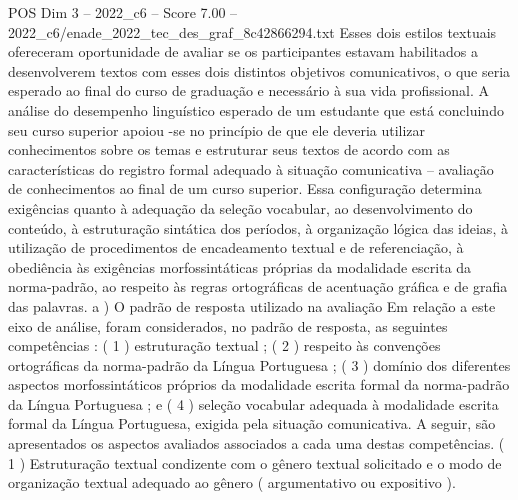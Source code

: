 \begin{textsample}{POS Dim 3 – 2022\_c6 – Score 7.00 – 2022\_c6/enade\_2022\_tec\_des\_graf\_8c42866294.txt}
Esses dois estilos textuais ofereceram oportunidade de avaliar se os participantes estavam habilitados a desenvolverem textos com esses dois distintos objetivos comunicativos, o que seria esperado ao final do curso de graduação e necessário à sua vida profissional.
A análise do desempenho linguístico esperado de um estudante que está concluindo seu curso superior apoiou -se no princípio de que ele deveria utilizar conhecimentos sobre os temas e estruturar seus textos de acordo com as características do registro formal adequado à situação comunicativa – avaliação de conhecimentos ao final de um curso superior.
Essa configuração determina exigências quanto à adequação da seleção vocabular, ao desenvolvimento do conteúdo, à estruturação sintática dos períodos, à organização lógica das ideias, à utilização de procedimentos de encadeamento textual e de referenciação, à obediência às exigências morfossintáticas próprias da modalidade escrita da norma-padrão, ao respeito às regras ortográficas de acentuação gráfica e de grafia das palavras. a ) O padrão de resposta utilizado na avaliação Em relação a este eixo de análise, foram considerados, no padrão de resposta, as seguintes competências : ( 1 ) estruturação textual ; ( 2 ) respeito às convenções ortográficas da norma-padrão da Língua Portuguesa ; ( 3 ) domínio dos diferentes aspectos morfossintáticos próprios da modalidade escrita formal da norma-padrão da Língua Portuguesa ; e ( 4 ) seleção vocabular adequada à modalidade escrita formal da Língua Portuguesa, exigida pela situação comunicativa.
A seguir, são apresentados os aspectos avaliados associados a cada uma destas competências. ( 1 ) Estruturação textual condizente com o gênero textual solicitado e o modo de organização textual adequado ao gênero ( argumentativo ou expositivo ).

\end{textsample}
